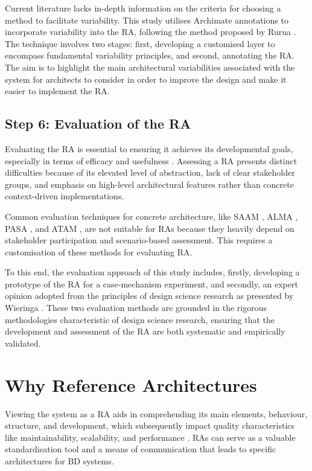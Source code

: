 \documentclass[preprint,12pt]{elsarticle}
\begin{document}
Current literature lacks in-depth information on the criteria for choosing a method to facilitate variability. This study utilises Archimate annotations to incorporate variability into the RA, following the method proposed by Rurua \cite{rurua2019representing}. The technique involves two stages: first, developing a customised layer to encompass fundamental variability principles, and second, annotating the RA. The aim is to highlight the main architectural variabilities associated with the system for architects to consider in order to improve the design and make it easier to implement the RA.

\subsection{Step 6: Evaluation of the RA}

Evaluating the RA is essential to ensuring it achieves its developmental goals, especially in terms of efficacy and usefulness \cite{Galster2011}. Assessing a RA presents distinct difficulties because of its elevated level of abstraction, lack of clear stakeholder groups, and emphasis on high-level architectural features rather than concrete context-driven implementations.

Common evaluation techniques for concrete architecture, like SAAM \cite{kazman1994saam}, ALMA \cite{Bengtsson2004}, PASA \cite{Williams2002}, and ATAM \cite{KazmanATAM}, are not suitable for RAs because they heavily depend on stakeholder participation and scenario-based assessment. This requires a customisation of these methods for evaluating RA.

To this end, the evaluation approach of this study includes, firstly, developing a prototype of the RA for a case-mechanism experiment, and secondly, an expert opinion adopted from the principles of design science research as presented by Wieringa \cite{wieringa2014design}. These two evaluation methods are grounded in the rigorous methodologies characteristic of design science research, ensuring that the development and assessment of the RA are both systematic and empirically validated.

\section{Why Reference Architectures}

\label{sec:why_reference_architectures}

Viewing the system as a RA aids in comprehending its main elements, behaviour, structure, and development, which subsequently impact quality characteristics like maintainability, scalability, and performance \cite{Cloutier2010}. RAs can serve as a valuable standardisation tool and a means of communication that leads to specific architectures for BD systems. 
\end{document}
